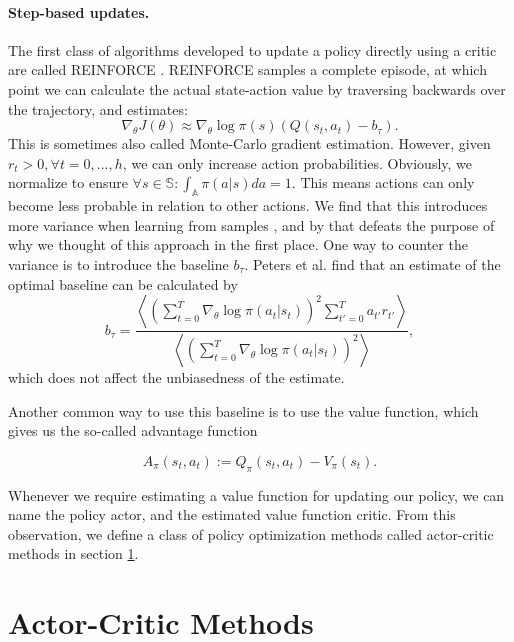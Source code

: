 \paragraph{Step-based updates.}
The first class of algorithms developed to update a policy directly using a critic are called REINFORCE \cite{Williams92simplestatistical}.
REINFORCE samples a complete episode, at which point we can calculate the actual state-action value by traversing backwards over the trajectory, and estimates:
\begin{equation}
	\nabla_\theta J(\theta) \approx \nabla_\theta\log\pi(s) \left(Q(s_t,a_t) - b_\tau \right).
	\label{eqn:reinforce}
\end{equation}
This is sometimes also called Monte-Carlo gradient estimation. 
However, given $r_t > 0, \forall t=0,\dots,h$, we can only increase action probabilities. 
Obviously, we normalize to ensure $\forall s \in \mathbb{S}: \int_\mathbb{A}{\pi(a|s)da} = 1$. 
This means actions can only become less probable in relation to other actions. 
We find that this introduces more variance when learning from samples \cite{Sutton:1999:PGM:3009657.3009806}, and by that defeats the purpose of why we thought of this approach in the first place. 
One way to counter the variance is to introduce the baseline $b_\tau$.
Peters et al. \cite{4867} find that an estimate of the optimal baseline can be calculated by
\begin{equation}
	b_\tau = \frac
		{\left\langle 
			\left(\sum_{t=0}^T \nabla_\theta \log\pi(a_t|s_t) \right)^2 \sum_{t'=0}^T a_{t'} r_{t'} 
		\right\rangle}
		{\left\langle
			\left(\sum_{t=0}^T \nabla_\theta \log\pi(a_t|s_t) \right)^2
		\right\rangle},
\end{equation}
which does not affect the unbiasedness of the estimate.

Another common way to use this baseline is to use the value function, which gives us the so-called advantage function

\begin{equation}
	A_{\pi}(s_t, a_t) := Q_{\pi}(s_t, a_t) - V_{\pi}(s_t).
	\label{eqn:adv}
\end{equation}

Whenever we require estimating a value function for updating our policy, we can name the policy actor, and the estimated value function critic. 
From this observation, we define a class of policy optimization methods called actor-critic methods in section \ref{sec:ac}.


\section{Actor-Critic Methods} 
\label{sec:ac}

